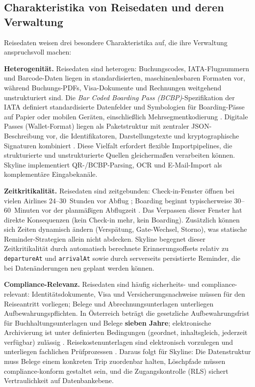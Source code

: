 \subsection{Charakteristika von Reisedaten und deren Verwaltung}

Reisedaten weisen drei besondere Charakteristika auf, die ihre Verwaltung
anspruchsvoll machen:

\medskip\noindent\textbf{Heterogenität.}
Reisedaten sind heterogen: Buchungscodes, IATA-Flugnummern und Barcode-Daten
liegen in standardisierten, maschinenlesbaren Formaten vor, während Buchungs-PDFs,
Visa-Dokumente und Rechnungen weitgehend unstrukturiert sind.
Die \textit{Bar Coded Boarding Pass (BCBP)}-Spezifikation der IATA
definiert standardisierte Datenfelder und Symbologien für Boarding-Pässe auf
Papier oder mobilen Geräten, einschließlich Mehrsegmentkodierung
\cite{iata2021_bcbp_implementation_guide}. Digitale Passes (Wallet-Format)
liegen als Paketstruktur mit zentraler JSON-Beschreibung vor, die Identifikatoren,
Darstellungstexte und kryptographische Signaturen kombiniert
\cite{apple2018_wallet_dev_guide_creating,google2024_wallet_generic_pass_flow}.
Diese Vielfalt erfordert flexible Importpipelines, die strukturierte und
unstrukturierte Quellen gleichermaßen verarbeiten können. Skyline implementiert
QR-/BCBP-Parsing, OCR und E-Mail-Import als komplementäre Eingabekanäle.

\medskip\noindent\textbf{Zeitkritikalität.}
Reisedaten sind zeitgebunden: Check-in-Fenster öffnen bei vielen Airlines
24--30~Stunden vor Abflug
\cite{lufthansa_online_checkin_30h,lufthansaCheckin};
Boarding beginnt typischerweise 30--60~Minuten vor der planmäßigen Abflugzeit
\cite{klm_boarding_times,aa_boarding_process,klmBoarding}.
Das Verpassen dieser Fenster hat direkte Konsequenzen (kein Check-in mehr,
kein Boarding). Zusätzlich können sich Zeiten dynamisch ändern (Verspätung,
Gate-Wechsel, Storno), was statische Reminder-Strategien allein nicht abdecken.
Skyline begegnet dieser Zeitkritikalität durch automatisch berechnete
Erinnerungsoffsets relativ zu \texttt{departureAt} und \texttt{arrivalAt}
sowie durch serverseits persistierte Reminder, die bei Datenänderungen
neu geplant werden können.

\medskip\noindent\textbf{Compliance-Relevanz.}
Reisedaten sind häufig sicherheits- und compliance-relevant: Identitätsdokumente,
Visa und Versicherungsnachweise müssen für den Reiseantritt vorliegen; Belege
und Abrechnungsunterlagen unterliegen Aufbewahrungspflichten. In Österreich
beträgt die gesetzliche Aufbewahrungsfrist für Buchhaltungsunterlagen und Belege
\textbf{sieben Jahre}; elektronische Archivierung ist unter definierten
Bedingungen (geordnet, inhaltsgleich, jederzeit verfügbar) zulässig
\cite{usp_aufbewahrungspflicht,wko_aufbewahrungspflichten}.
Reisekostenunterlagen sind elektronisch vorzulegen und unterliegen fachlichen
Prüfprozessen \cite{bmbwf_reisegebuehren_arbeitsbehelf}.
Daraus folgt für Skyline: Die Datenstruktur muss Belege einem konkreten Trip
zuordenbar halten, Löschpfade müssen compliance-konform gestaltet sein, und
die Zugangskontrolle (RLS) sichert Vertraulichkeit auf Datenbankebene.

